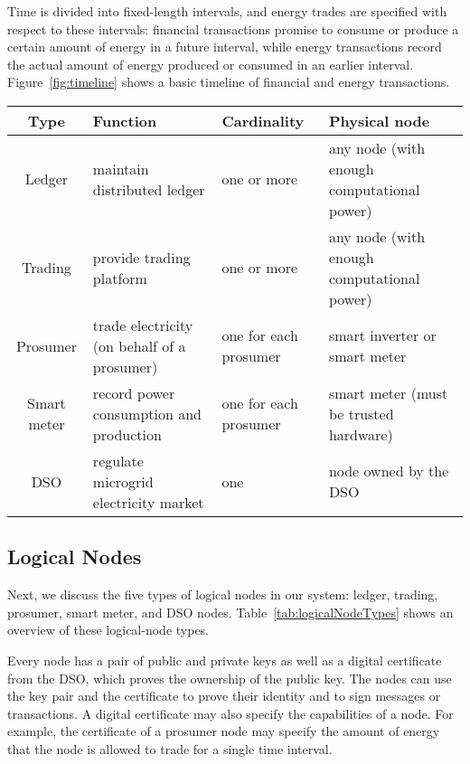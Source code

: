 \documentclass[sigconf]{acmart}
\begin{document}
Time is divided into fixed-length intervals, and energy trades are specified with respect to these intervals: financial transactions promise to consume or produce a certain amount of energy in a future interval, while energy transactions record the actual amount of energy produced or consumed in an earlier interval. 
Figure~\ref{fig:timeline} shows a basic timeline of financial and energy transactions.

\begin{table*}
\caption{Logical Node Types}
\label{tab:logicalNodeTypes}
\begin{tabular}{|c||l|l|l|}
\hline
\textbf{Type} & \textbf{Function} & \textbf{Cardinality} & \textbf{Physical node} \\
\hline\hline
\rowcolor{Gray} Ledger      & maintain distributed ledger                 & one or more           & any node (with enough computational power) \\ \hline
                Trading     & provide trading platform                    & one or more           & any node (with enough computational power) \\ \hline
\rowcolor{Gray} Prosumer    & trade electricity (on behalf of a prosumer) & one for each prosumer & smart inverter or smart meter \\ \hline
                Smart meter & record power consumption and production     & one for each prosumer & smart meter (must be trusted hardware) \\ \hline
\rowcolor{Gray} DSO         & regulate microgrid electricity market       & one                   & node owned by the DSO \\ \hline
\end{tabular}
\end{table*}

\subsection{Logical Nodes}

Next, we discuss the five types of logical nodes in our system: ledger, trading, prosumer, smart meter, and DSO nodes.
Table~\ref{tab:logicalNodeTypes} shows an overview of these logical-node types.

Every node has a pair of public and private keys as well as a digital certificate from the DSO, which proves the ownership of the public key.
The nodes can use the key pair and the certificate to prove their identity and to sign messages or transactions.
A digital certificate may also specify the capabilities of a node.
For example, the certificate of a prosumer node may specify the amount of energy that the node is allowed to trade for a single time interval.
\end{document}

